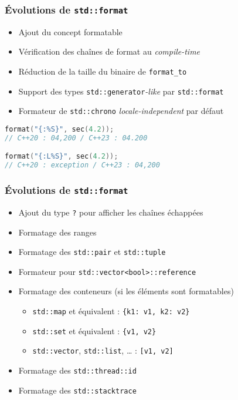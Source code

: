 \documentclass[C++.tex]{subfiles}
\begin{document}
\begin{frame}[fragile]
	\frametitle{Évolutions de \lstinline|std::format|}
	\begin{itemize}
		\item Ajout du concept formatable
		\item Vérification des chaînes de format au \textit{compile-time}
		\item Réduction de la taille du binaire de \lstinline|format_to|
		\item Support des types \lstinline|std::generator|\textit{-like} par \lstinline|std::format|
		\item Formateur de \lstinline|std::chrono| \textit{locale-independent} par défaut

	\end{itemize}

	\begin{lstlisting}[language=C++]
format("{:%S}", sec(4.2));
// C++20 : 04,200 / C++23 : 04.200

format("{:L%S}", sec(4.2));
// C++20 : exception / C++23 : 04,200\end{lstlisting}
\end{frame}

\begin{frame}[fragile]
	\frametitle{Évolutions de \lstinline|std::format|}
	\begin{itemize}
		\item Ajout du type \lstinline|?| pour afficher les chaînes échappées
		\item Formatage des ranges
		\item Formatage des \lstinline|std::pair| et \lstinline|std::tuple|
		\item Formateur pour \lstinline|std::vector<bool>::reference|
		\item Formatage des conteneurs (si les éléments sont formatables)
		\begin{itemize}
			\item \lstinline|std::map| et équivalent : \lstinline|{k1: v1, k2: v2}|
			\item \lstinline|std::set| et équivalent : \lstinline|{v1, v2}|
			\item \lstinline|std::vector|, \lstinline|std::list|, \ldots{} : \lstinline|[v1, v2]|
		\end{itemize}
		\item Formatage des \lstinline|std::thread::id|
		\item Formatage des \lstinline|std::stacktrace|
	\end{itemize}
\end{frame}
\end{document}
